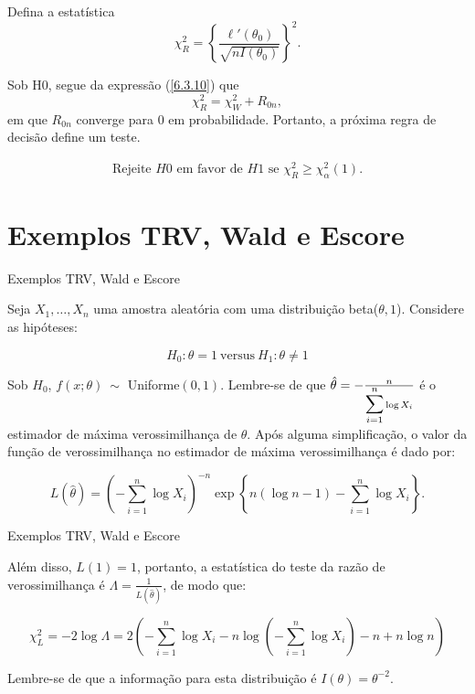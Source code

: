 \documentclass[12pt]{beamer}
\begin{document}
\begin{frame}{}
\begin{block}{}
\justifying
Defina a estatística
\[
\chi^2_R = \left\{\frac{\ell'(\theta_{0})}{\sqrt{nI(\theta_0)}}\right\}^2. 
\]

Sob H0, segue da expressão (\ref{6.3.10}) que
\[
\chi^2_R = \chi^2_W + R_{0n},
\]
em que $R_{0n}$ converge para $0$ em probabilidade. Portanto, a próxima regra de decisão define um teste.
\end{block}
\pause
\begin{block}{}
\justifying
\begin{align}\label{6.3.20}
    \text{Rejeite } H0 \text{ em favor de } H1 \text{ se } \chi^2_R \geq \chi^2_\alpha(1).
\end{align}
\end{block}
\end{frame}

\section{Exemplos TRV, Wald e Escore}
\begin{frame}{Exemplos TRV, Wald e Escore}
\begin{block}{}
\justifying
Seja \(X_1, \ldots, X_n\) uma amostra aleatória com uma distribuição beta(\(\theta, 1\)). Considere as hipóteses: 

$$H_0: \theta = 1~ \text{versus}~ H_1: \theta \neq 1$$
\end{block}
\pause
\begin{block}{}
\justifying
Sob \(H_0\), \(f(x; \theta)~\sim\) Uniforme\((0, 1)\). Lembre-se de que \(\hat{\theta} = -\frac{n}{{\displaystyle \sum_{i=1}^{n}} \log X_i}\) é o estimador de máxima verossimilhança de \(\theta\). Após alguma simplificação, o valor da função de verossimilhança no estimador de máxima verossimilhança é dado por:

\[L(\hat{\theta}) = \left(- \sum_{i=1}^n \log X_i\right)^{-n}\exp\left\{n(\log n - 1) - \sum_{i=1}^n \log X_i\right\}.\] 
\end{block}
\end{frame}

\begin{frame}{Exemplos TRV, Wald e Escore}
\begin{block}{}
\justifying
Além disso, \(L(1) = 1\), portanto, a estatística do teste da razão de verossimilhança é \(\Lambda = \frac{1}{L(\hat{\theta})}\), de modo que:

{\small
\[\chi^2_L = -2 \log \Lambda = 2\left(- \sum_{i=1}^n \log X_i - n \log\left(-\sum_{i=1}^n \log X_i\right) - n + n \log n\right)\]
}

Lembre-se de que a informação para esta distribuição é \(I(\theta) = \theta^{-2}\). 
\end{block}
\end{frame}
\end{document}
